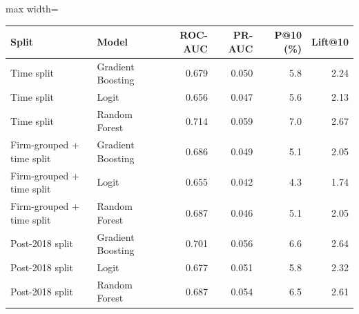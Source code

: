 \begin{table}[!htbp]
 \label{tab:no_sales_robustness_v2}
\centering
\footnotesize
\setlength{\tabcolsep}{4pt}
\begin{adjustbox}{max width=\textwidth}
\begin{tabular}{llrrrr}
\hline
Split & Model & ROC-AUC & PR-AUC & P@10 (\%) & Lift@10 \\
\hline
Time split & Gradient Boosting & 0.679 & 0.050 & 5.8 & 2.24 \\
Time split & Logit & 0.656 & 0.047 & 5.6 & 2.13 \\
Time split & Random Forest & 0.714 & 0.059 & 7.0 & 2.67 \\
Firm-grouped + time split & Gradient Boosting & 0.686 & 0.049 & 5.1 & 2.05 \\
Firm-grouped + time split & Logit & 0.655 & 0.042 & 4.3 & 1.74 \\
Firm-grouped + time split & Random Forest & 0.687 & 0.046 & 5.1 & 2.05 \\
Post-2018 split & Gradient Boosting & 0.701 & 0.056 & 6.6 & 2.64 \\
Post-2018 split & Logit & 0.677 & 0.051 & 5.8 & 2.32 \\
Post-2018 split & Random Forest & 0.687 & 0.054 & 6.5 & 2.61 \\
\hline
\end{tabular}
\end{adjustbox}
\end{table}